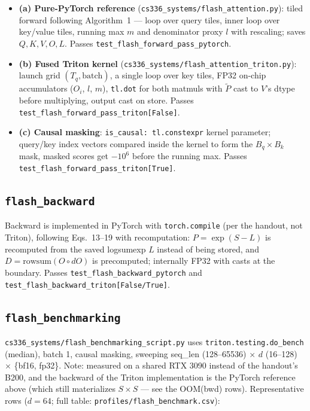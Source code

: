 \documentclass[11pt]{article}
\newcommand{\code}[1]{\texttt{#1}}
\begin{document}
\begin{itemize}
\item \textbf{(a) Pure-PyTorch reference} (\code{cs336\_systems/flash\_attention.py}):
      tiled forward following Algorithm~1 --- loop over query tiles, inner loop over key/value
      tiles, running max $m$ and denominator proxy $l$ with rescaling; saves $Q, K, V, O, L$.
      Passes \code{test\_flash\_forward\_pass\_pytorch}.
\item \textbf{(b) Fused Triton kernel} (\code{cs336\_systems/flash\_attention\_triton.py}):
      launch grid $(T_q, \text{batch})$, a single loop over key tiles, FP32 on-chip accumulators
      ($O_i$, $l$, $m$), \code{tl.dot} for both matmuls with $\tilde{P}$ cast to $V$'s dtype before
      multiplying, output cast on store. Passes \code{test\_flash\_forward\_pass\_triton[False]}.
\item \textbf{(c) Causal masking}: \code{is\_causal: tl.constexpr} kernel parameter; query/key index
      vectors compared inside the kernel to form the $B_q \times B_k$ mask, masked scores get
      $-10^6$ before the running max. Passes \code{test\_flash\_forward\_pass\_triton[True]}.
\end{itemize}

\subsection{\texttt{flash\_backward}}

Backward is implemented in PyTorch with \code{torch.compile} (per the handout, not Triton),
following Eqs.~13--19 with recomputation: $P = \exp(S - L)$ is recomputed from the saved logsumexp
$L$ instead of being stored, and $D = \mathrm{rowsum}(O \circ dO)$ is precomputed; internally FP32
with casts at the boundary. Passes \code{test\_flash\_backward\_pytorch} and
\code{test\_flash\_backward\_triton[False/True]}.

\subsection{\texttt{flash\_benchmarking}}

\code{cs336\_systems/flash\_benchmarking\_script.py} uses \code{triton.testing.do\_bench} (median),
batch 1, causal masking, sweeping seq\_len (128--65536) $\times$ $d$ (16--128) $\times$ \{bf16,
fp32\}. Note: measured on a shared RTX 3090 instead of the handout's B200, and the backward of the
Triton implementation is the PyTorch reference above (which still materializes $S \times S$ --- see
the OOM(bwd) rows). Representative rows ($d=64$; full table: \code{profiles/flash\_benchmark.csv}):
\end{document}
